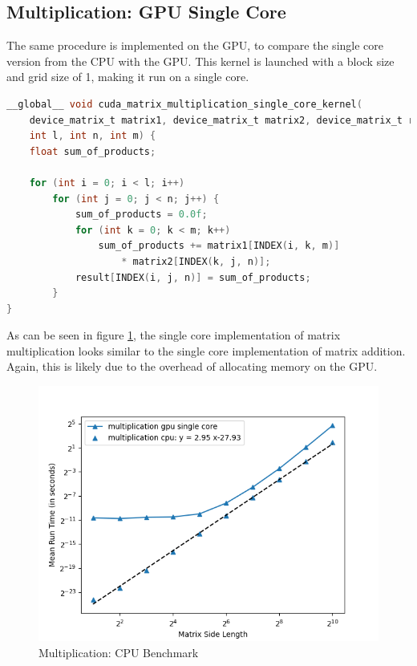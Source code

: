 \subsection{Multiplication: GPU Single Core}

The same procedure is implemented on the GPU, to compare the single core version from the CPU with the GPU. This kernel is launched with a block size and grid size of 1, making it run on a single core.

\begin{lstlisting}[language=C, caption={Matrix Multiplication on the gpu}, label={lst:matrix_multiplication_gpu}]
__global__ void cuda_matrix_multiplication_single_core_kernel(
    device_matrix_t matrix1, device_matrix_t matrix2, device_matrix_t result,
    int l, int n, int m) {
    float sum_of_products;

    for (int i = 0; i < l; i++)
        for (int j = 0; j < n; j++) {
            sum_of_products = 0.0f;
            for (int k = 0; k < m; k++)
                sum_of_products += matrix1[INDEX(i, k, m)] 
                    * matrix2[INDEX(k, j, n)];
            result[INDEX(i, j, n)] = sum_of_products;
        }
}
\end{lstlisting}

As can be seen in figure \ref{fig:mul_cpu_bench}, the single core implementation of matrix multiplication looks similar to the single core implementation of matrix addition. Again, this is likely due to the overhead of allocating memory on the GPU.

\begin{figure}[h]
  \includegraphics[width=\textwidth]{SavedBenchmarksAndDiagrams/Machine 2/Multiplication/CPU, GPU SC.png}
  \centering
  \caption{Multiplication: CPU Benchmark}
  \label{fig:mul_cpu_bench}
\end{figure}

